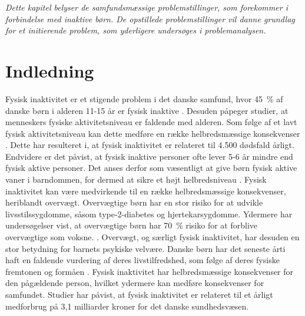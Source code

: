 \textit{Dette kapitel belyser de samfundsmæssige problemstillinger, som forekommer i forbindelse med inaktive børn. De opstillede problemstillinger vil danne grundlag for et initierende problem, som yderligere undersøges i problemanalysen.}

\section{Indledning}
Fysisk inaktivitet er et stigende problem i det danske samfund, hvor 45~\% af danske børn i alderen 11-15 år er fysisk inaktive \citep{Sundhedsstyrelsen2006}. Desuden påpeger studier, at menneskers fysiske aktivitetsniveau er faldende med alderen. Som følge af et lavt fysisk aktivitetsniveau kan dette medføre en række helbredsmæssige konsekvenser \citep{Sundhedsstyrelsen2006}. Dette har resulteret i, at fysisk inaktivitet er relateret til 4.500 dødsfald årligt. Endvidere er det påvist, at fysisk inaktive personer ofte lever 5-6 år mindre end fysisk aktive personer. \citep{JuelSoerensenBroennum-Hansen2006} Det anses derfor som væsentligt at give børn fysisk aktive vaner i barndommen, for dermed at sikre et højt helbredsniveau \citep{L.MeyerP.Gullotta2012}. \newline
Fysisk inaktivitet kan være medvirkende til en række helbredsmæssige konsekvenser, heriblandt overvægt. Overvægtige børn har en stor risiko for at udvikle
livsstilssygdomme, såsom type-2-diabetes og hjertekarsygdomme. Ydermere har undersøgelser vist, at overvægtige børn har 70~\% risiko for at forblive overvægtige som voksne. \citep{Reilly2006}. Overvægt, og særligt fysisk inaktivitet, har desuden en stor betydning for barnets psykiske velvære. Danske børn har det seneste årti haft en faldende vurdering af deres livstilfredshed, som følge af deres fysiske fremtonen og formåen \citep{Universitet2014,StatensInstitutforFolkesundhed2007}. \newline
Fysisk inaktivitet har helbredsmæssige konsekvenser for den pågældende person, hvilket ydermere kan medføre konsekvenser for samfundet. Studier har påvist, at fysisk inaktivitet er relateret til et årligt medforbrug på 3,1 milliarder kroner for det danske sundhedsvæsen. \citep{JuelSoerensenBroennum-Hansen2006}

